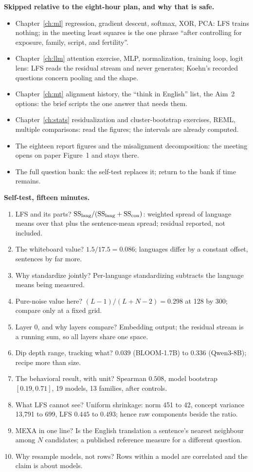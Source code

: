 \textbf{Skipped relative to the eight-hour plan, and why that is safe.}
\begin{itemize}[itemsep=1pt]
\item Chapter~\ref{ch:ml} regression, gradient descent, softmax, XOR, PCA: LFS trains nothing; in the meeting least squares is the one phrase ``after controlling for exposure, family, script, and fertility''.
\item Chapter~\ref{ch:llm} attention exercise, MLP, normalization, training loop, logit lens: LFS reads the residual stream and never generates; Koehn's recorded questions concern pooling and the shape.
\item Chapter~\ref{ch:mt} alignment history, the ``think in English'' list, the Aim~2 options: the brief scripts the one answer that needs them.
\item Chapter~\ref{ch:stats} residualization and cluster-bootstrap exercises, REML, multiple comparisons: read the figures; the intervals are already computed.
\item The eighteen report figures and the misalignment decomposition: the meeting opens on paper Figure~1 and stays there.
\item The full question bank: the self-test replaces it; return to the bank if time remains.
\end{itemize}

\textbf{Self-test, fifteen minutes.}
\begin{enumerate}[itemsep=1pt]
\item LFS and its parts? $\mathrm{SS}_{\mathrm{lang}}/(\mathrm{SS}_{\mathrm{lang}}+\mathrm{SS}_{\mathrm{con}})$: weighted spread of language means over that plus the sentence-mean spread; residual reported, not included.
\item The whiteboard value? $1.5/17.5 = 0.086$; languages differ by a constant offset, sentences by far more.
\item Why standardize jointly? Per-language standardizing subtracts the language means being measured.
\item Pure-noise value here? $(L-1)/(L+N-2) = 0.298$ at 128 by 300; compare only at a fixed grid.
\item Layer $0$, and why layers compare? Embedding output; the residual stream is a running sum, so all layers share one space.
\item Dip depth range, tracking what? $0.039$ (BLOOM-1.7B) to $0.336$ (Qwen3-8B); recipe more than size.
\item The behavioral result, with unit? Spearman $0.508$, model bootstrap $[0.19, 0.71]$, 19 models, 13 families, after controls.
\item What LFS cannot see? Uniform shrinkage: norm 451 to 42, concept variance 13{,}791 to 699, LFS $0.445$ to $0.493$; hence raw components beside the ratio.
\item MEXA in one line? Is the English translation a sentence's nearest neighbour among $N$ candidates; a published reference measure for a different question.
\item Why resample models, not rows? Rows within a model are correlated and the claim is about models.
\end{enumerate}

